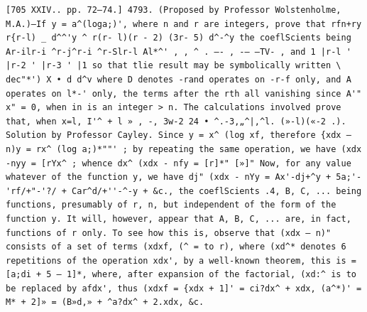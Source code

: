 \documentclass[12pt]{article}
\theoremstyle{plain}
\begin{document}
\newpage
\setcounter{page}{590}
\begin{verbatim}
[705 XXIV.. pp. 72—74.] 4793. (Proposed by Professor Wolstenholme, M.A.)—If y = a^(loga;)', where n and r are integers, prove that rfn+ry r{r-l) _ d^^'y ^ r(r- l)(r - 2) (3r- 5) d^-^y the coeflScients being Ar-ilr-i ^r-j^r-i ^r-Slr-l Al*^' , , ^ . —- , -— —TV- , and 1 |r-l ' |r-2 ' |r-3 ' |1 so that tlie result may be symbolically written \ dec"*') X • d d^v where D denotes -rand operates on -r-f only, and A operates on l*-' only, the terms after the rth all vanishing since A'" x" = 0, when in is an integer > n. The calculations involved prove that, when x=l, I'^ + l » , -, 3w-2 24 • ^.-3,„^|,^l. (»-l)(«-2 .). Solution by Professor Cayley. Since y = x^ (log xf, therefore {xdx — n)y = rx^ (log a;)*""' ; by repeating the same operation, we have (xdx -nyy = [rYx^ ; whence dx^ (xdx - nfy = [r]*" [»]" Now, for any value whatever of the function y, we have dj" (xdx - nYy = Ax'-dj+^y + 5a;'-'rf/+"-'?/ + Car^d/+''-^-y + &c., the coeflScients .4, B, C, ... being functions, presumably of r, n, but independent of the form of the function y. It will, however, appear that A, B, C, ... are, in fact, functions of r only. To see how this is, observe that (xdx — n)" consists of a set of terms (xdxf, (^ = to r), where (xd^* denotes 6 repetitions of the operation xdx', by a well-known theorem, this is =[a;di + 5 — 1]*, where, after expansion of the factorial, (xd:^ is to be replaced by afdx', thus (xdxf = {xdx + 1]' = ci?dx^ + xdx, (a^*)' = M* + 2]» = (B»d,» + ^a?dx^ + 2.xdx, &c. 
\end{verbatim}
\end{document}
